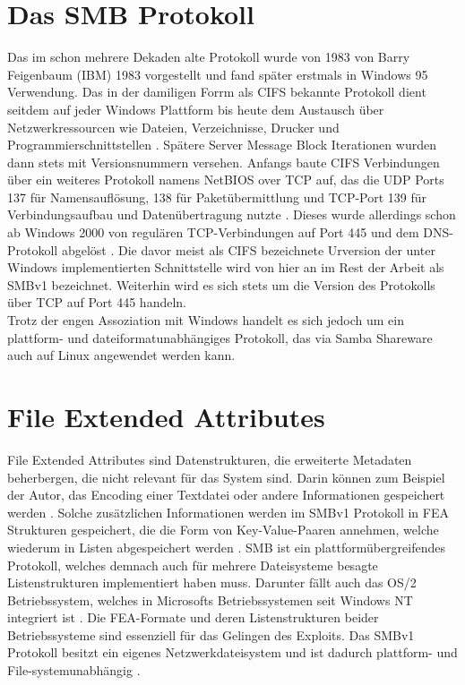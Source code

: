 \documentclass[DIV=12,headings=normal,pdftex,headinclude=false,footinclude=false,final]{scrreprt}
\begin{document}
\section{Das SMB Protokoll}
Das im schon mehrere Dekaden alte Protokoll wurde von 1983 von Barry Feigenbaum (IBM) 1983 vorgestellt und fand später erstmals in Windows 95 Verwendung. Das in der damiligen Forrm als CIFS bekannte Protokoll dient seitdem auf jeder Windows Plattform bis heute dem Austausch über Netzwerkressourcen wie Dateien, Verzeichnisse, Drucker und Programmierschnittstellen \cite{CompWeek:SMB}. Spätere Server Message Block Iterationen wurden dann stets mit Versionsnummern versehen. Anfangs baute CIFS Verbindungen über ein weiteres Protokoll namens NetBIOS over TCP auf, das die UDP Ports 137 für Namensauflösung, 138 für Paketübermittlung und TCP-Port 139 für Verbindungsaufbau und Datenübertragung nutzte \cite{MS:NetBIOS}. Dieses wurde allerdings schon ab Windows 2000 von regulären TCP-Verbindungen auf Port 445 und dem DNS-Protokoll abgelöst \cite{IONOS}. Die davor meist als CIFS bezeichnete Urversion der unter Windows implementierten Schnittstelle wird von hier an im Rest der Arbeit als SMBv1 bezeichnet. Weiterhin wird es sich stets um die Version des Protokolls über TCP auf Port 445 handeln.\\
Trotz der engen Assoziation mit Windows handelt es sich jedoch um ein plattform- und dateiformatunabhängiges Protokoll, das via Samba Shareware auch auf Linux angewendet werden kann\cite{IONOS}. 

\section{File Extended Attributes}
File Extended Attributes sind Datenstrukturen, die erweiterte Metadaten beherbergen, die nicht relevant für das System sind. Darin können zum Beispiel der Autor, das Encoding einer Textdatei oder andere Informationen gespeichert werden \cite{Wiki:FEA}. Solche zusätzlichen Informationen werden im SMBv1 Protokoll in FEA Strukturen gespeichert, die die Form von Key-Value-Paaren annehmen, welche wiederum in Listen abgespeichert werden \cite{CP}. SMB ist ein plattformübergreifendes Protokoll, welches demnach auch für mehrere Dateisysteme besagte Listenstrukturen implementiert haben muss. Darunter fällt auch das OS/2 Betriebssystem, welches in Microsofts Betriebssystemen seit Windows NT integriert ist \cite{MS:OS2Subsys}. Die FEA-Formate und deren Listenstrukturen beider Betriebssysteme sind essenziell für das Gelingen des Exploits. Das SMBv1 Protokoll besitzt ein eigenes Netzwerkdateisystem und ist dadurch plattform- und File-systemunabhängig \cite{CompWeek:SMB}.
\end{document}

